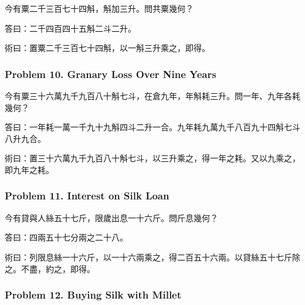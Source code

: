 \documentclass[11pt,a4paper]{article}
\newcommand{\zh}[1]{{\CJKfamily{}#1}}
\begin{document}
\begin{problembox}[title=\zh{問}]
\zh{今有粟二千三百七十四斛，斛加三升。問共粟幾何？}
\end{problembox}
\begin{answerbox}[title=\zh{答}]
\zh{答曰：二千四百四十五斛二斗二升。}
\end{answerbox}
\begin{methodbox}[title=\zh{術}]
\zh{術曰：置粟二千三百七十四斛，以一斛三升乘之，即得。}
\end{methodbox}

\subsubsection*{Problem 10. Granary Loss Over Nine Years}

\begin{problembox}[title=\zh{問}]
\zh{今有粟三十六萬九千九百八十斛七斗，在倉九年，年斛耗三升。問一年、九年各耗幾何？}
\end{problembox}
\begin{answerbox}[title=\zh{答}]
\zh{答曰：一年耗一萬一千九十九斛四斗二升一合。九年耗九萬九千八百九十四斛七斗八升九合。}
\end{answerbox}
\begin{methodbox}[title=\zh{術}]
\zh{術曰：置三十六萬九千九百八十斛七斗，以三升乘之，得一年之耗。又以九乘之，即九年之耗。}
\end{methodbox}

\subsubsection*{Problem 11. Interest on Silk Loan}

\begin{problembox}[title=\zh{問}]
\zh{今有貸與人絲五十七斤，限歲出息一十六斤。問斤息幾何？}
\end{problembox}
\begin{answerbox}[title=\zh{答}]
\zh{答曰：四兩五十七分兩之二十八。}
\end{answerbox}
\begin{methodbox}[title=\zh{術}]
\zh{術曰：列限息絲一十六斤，以一十六兩乘之，得二百五十六兩。以貸絲五十七斤除之。不盡，約之，即得。}
\end{methodbox}

\subsubsection*{Problem 12. Buying Silk with Millet}
\end{document}
